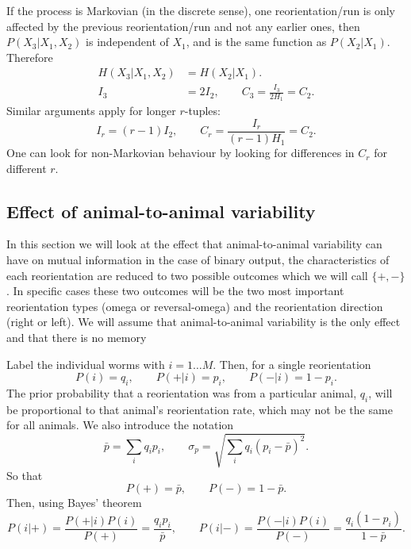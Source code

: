 \documentclass[12pt]{article}
\begin{document}
If the process is Markovian (in the discrete sense), \ie one reorientation/run is only affected by the previous reorientation/run and not any earlier ones, then $P(X_3 \vert X_1,X_2)$ is independent of $X_1$, and is the same function as $P(X_2 \vert X_1)$. Therefore
%
\begin{equation}\label{eq:tripvspair}
  \begin{aligned}
    H(X_3|X_1,X_2) &= H(X_2|X_1).\\
    I_3 &= 2I_2, \qquad C_3 = \frac{I_3}{2H_1} = C_2.
  \end{aligned}
\end{equation}
%
Similar arguments apply for longer $r$-tuples:
 \begin{equation}\label{eq:markovinf}
   I_r = (r-1)I_2, \qquad C_r = \frac{I_r}{(r-1)H_1} = C_2.
\end{equation}
%
One can look for non-Markovian behaviour by looking for differences in $C_r$ for different $r$.


\subsection{Effect of animal-to-animal variability}\label{sec:variability}

In this section we will look at the effect that animal-to-animal variability can have on mutual information in the case of binary output, \ie the characteristics of each reorientation are reduced to two possible outcomes which we will call $\{+,-\}$. In specific cases these two outcomes will be the two most important reorientation types (omega or reversal-omega) and the reorientation direction (right or left). We will assume that animal-to-animal variability is the only effect and that there is no memory

Label the individual worms with $i=1\ldots M$. Then, for a single reorientation
%
\begin{equation}\label{eq:varisinglereo}
  P(i) = q_i, \qquad
  P(+|i) = p_i, \qquad
  P(-|i) = 1-p_i.
\end{equation}
%
The prior probability that a reorientation was from a particular animal, $q_i$, will be proportional to that animal's reorientation rate, which may not be the same for all animals. We also introduce the notation
%
\begin{equation}\label{eq:varinot}
  \bar{p} = \sum_i q_i p_i, \qquad
  \sigma_p = \sqrt{\sum_i q_i(p_i-\bar{p})^2}.
\end{equation}
%
So that
%
\begin{equation}\label{eq:varimarg}
  P(+) = \bar{p}, \qquad P(-) = 1-\bar{p}.
\end{equation}
%
Then, using Bayes' theorem
%
\begin{equation}\label{eq:singlereobayes}
  P(i|+) = \frac{P(+|i)P(i)}{P(+)} = \frac{q_ip_i}{\bar{p}}, \qquad
  P(i|-) = \frac{P(-|i)P(i)}{P(-)} = \frac{q_i(1-p_i)}{1-\bar{p}}.
\end{equation}
%
\end{document}

